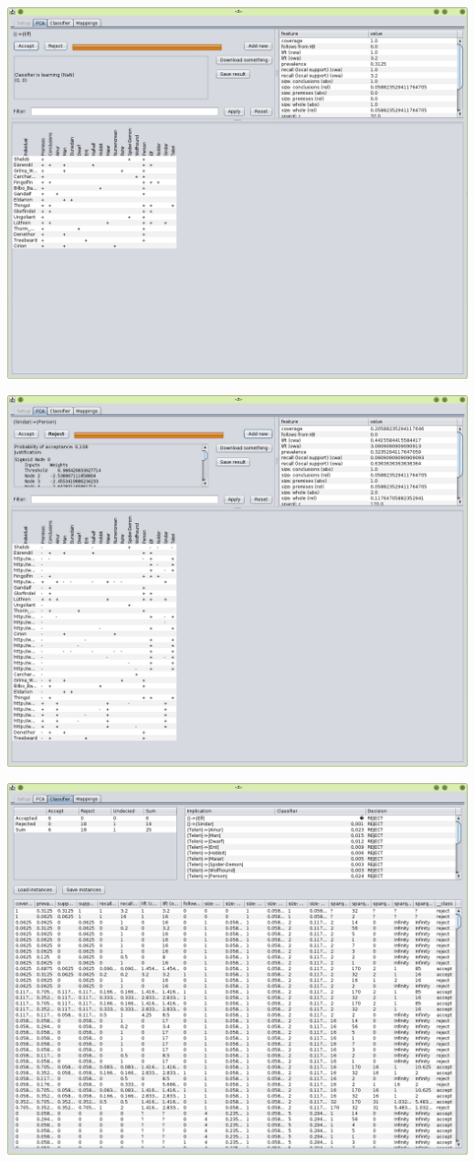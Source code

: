 \documentclass{llncs}
\begin{document}
\includegraphics[width=\textwidth]{screenshots/fca1.png}

\includegraphics[width=\textwidth]{screenshots/fca2.png}

\includegraphics[width=\textwidth]{screenshots/classifier.png}



\end{document}
